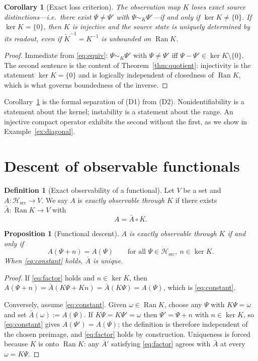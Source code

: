 \documentclass[11pt,reqno]{amsart}
\numberwithin{equation}{section}
\theoremstyle{plain}
\newtheorem{proposition}[theorem]{Proposition}
\newtheorem{corollary}[theorem]{Corollary}
\theoremstyle{definition}
\newtheorem{definition}[theorem]{Definition}
\theoremstyle{remark}
\newcommand{\Hsrc}{\mathcal{H}_{\mathrm{src}}}
\newcommand{\Ran}{\operatorname{Ran}}
\newcommand{\Kt}{\widetilde{K}}
\begin{document}
\begin{corollary}[Exact loss criterion]
\label{cor:loss}
The observation map $K$ loses exact source distinctions---i.e.\ there exist $\Psi\neq\Psi'$
with $\Psi\sim_{K}\Psi'$---if and only if $\ker K\neq\{0\}$. If $\ker K=\{0\}$, then $K$ is
injective and the source state is uniquely determined by its readout, \emph{even if}
$\Kt^{-1}=K^{-1}$ is unbounded on $\Ran K$.
\end{corollary}

\begin{proof}
Immediate from \eqref{eq:equiv}: $\Psi\sim_K\Psi'$ with $\Psi\neq\Psi'$ iff
$\Psi-\Psi'\in\ker K\setminus\{0\}$. The second sentence is the content of
Theorem~\ref{thm:quotient}: injectivity is the statement $\ker K=\{0\}$ and is logically
independent of closedness of $\Ran K$, which is what governs boundedness of the inverse.
\end{proof}

Corollary~\ref{cor:loss} is the formal separation of (D1) from (D2). Nonidentifiability is
a statement about the kernel; instability is a statement about the range. An injective
compact operator exhibits the second without the first, as we show in
Example~\ref{ex:diagonal}.

\section{Descent of observable functionals}
\label{sec:functionals}

\begin{definition}[Exact observability of a functional]
\label{def:obsfun}
Let $V$ be a set and $A:\Hsrc\to V$. We say $A$ is \emph{exactly observable through $K$} if
there exists $\bar A:\Ran K\to V$ with
\begin{equation}
\label{eq:factor}
A=\bar A\circ K .
\end{equation}
\end{definition}

\begin{proposition}[Functional descent]
\label{prop:descent}
$A$ is exactly observable through $K$ if and only if
\begin{equation}
\label{eq:constant}
A(\Psi+n)=A(\Psi)
\qquad\text{for all }\Psi\in\Hsrc,\ n\in\ker K .
\end{equation}
When \eqref{eq:constant} holds, $\bar A$ is unique.
\end{proposition}

\begin{proof}
If \eqref{eq:factor} holds and $n\in\ker K$, then
$A(\Psi+n)=\bar A(K\Psi+Kn)=\bar A(K\Psi)=A(\Psi)$, which is \eqref{eq:constant}.

Conversely, assume \eqref{eq:constant}. Given $\omega\in\Ran K$, choose any $\Psi$ with
$K\Psi=\omega$ and set $\bar A(\omega):=A(\Psi)$. If $K\Psi=K\Psi'=\omega$ then
$\Psi'=\Psi+n$ with $n\in\ker K$, so \eqref{eq:constant} gives $A(\Psi')=A(\Psi)$; the
definition is therefore independent of the chosen preimage, and \eqref{eq:factor} holds by
construction. Uniqueness is forced because $K$ is onto $\Ran K$: any $\bar A'$ satisfying
\eqref{eq:factor} agrees with $\bar A$ at every $\omega=K\Psi$.
\end{proof}
\end{document}
